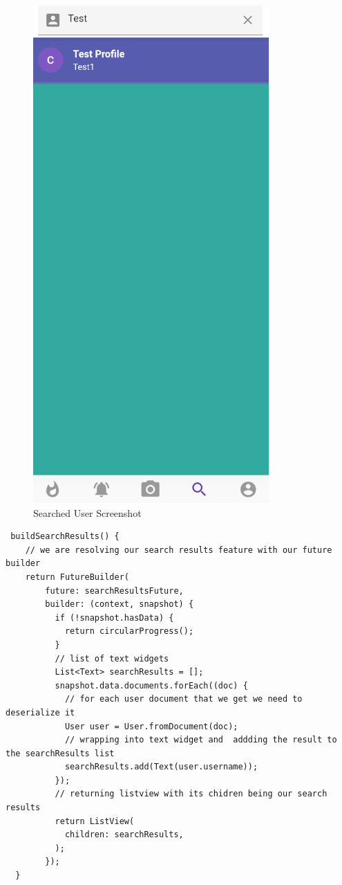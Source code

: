 \begin{figure}[!htb]
    \centering
    \includegraphics[scale=0.70]{AppScreenShots/searched user.PNG}
    \caption{Searched User Screenshot}
    \label{fig:Searched User Screenshot}
\end{figure}

\begin{verbatim}
 buildSearchResults() {
    // we are resolving our search results feature with our future builder
    return FutureBuilder(
        future: searchResultsFuture,
        builder: (context, snapshot) {
          if (!snapshot.hasData) {
            return circularProgress();
          }
          // list of text widgets
          List<Text> searchResults = [];
          snapshot.data.documents.forEach((doc) {
            // for each user document that we get we need to deserialize it
            User user = User.fromDocument(doc);
            // wrapping into text widget and  addding the result to the searchResults list
            searchResults.add(Text(user.username));
          });
          // returning listview with its chidren being our search results
          return ListView(
            children: searchResults,
          );
        });
  }
\end{verbatim}

